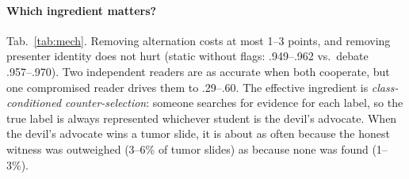 \documentclass[10pt,twocolumn,letterpaper]{article}
\begin{document}
\begin{table}[t]\centering\small
\caption{\textbf{Which ingredient matters?} CAMELYON16 BA (mean$\pm$sd, 3 seeds), every protocol with its own on-policy judge from the same warm start, equal budget $B$.}\label{tab:mech}
\setlength{\tabcolsep}{3pt}
\end{table}
\paragraph{Which ingredient matters?} Tab.~\ref{tab:mech}. Removing alternation costs at most 1--3 points, and removing presenter identity does not hurt (static without flags: .949--.962 vs.\ debate .957--.970). Two independent readers are as accurate when both cooperate, but one compromised reader drives them to .29--.60. The effective ingredient is \emph{class-conditioned counter-selection}: someone searches for evidence for each label, so the true label is always represented whichever student is the devil's advocate. When the devil's advocate wins a tumor slide, it is about as often because the honest witness was outweighed (3--6\% of tumor slides) as because none was found (1--3\%).
\end{document}
